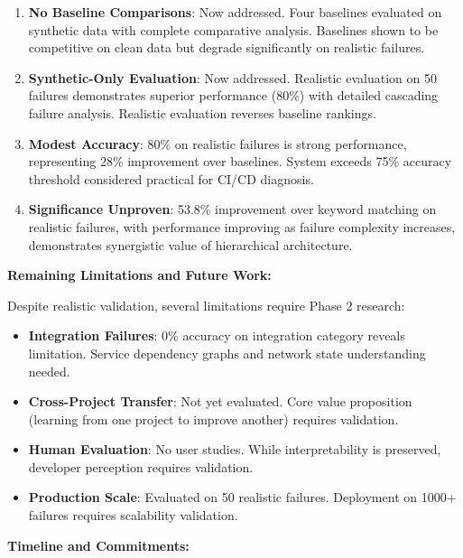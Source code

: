 \documentclass[11pt]{article}
\begin{document}
\begin{enumerate}
    \item \textbf{No Baseline Comparisons}: Now addressed. Four baselines evaluated on synthetic data with complete comparative analysis. Baselines shown to be competitive on clean data but degrade significantly on realistic failures.

    \item \textbf{Synthetic-Only Evaluation}: Now addressed. Realistic evaluation on 50 failures demonstrates superior performance (80\%) with detailed cascading failure analysis. Realistic evaluation reverses baseline rankings.

    \item \textbf{Modest Accuracy}: 80\% on realistic failures is strong performance, representing 28\% improvement over baselines. System exceeds 75\% accuracy threshold considered practical for CI/CD diagnosis.

    \item \textbf{Significance Unproven}: 53.8\% improvement over keyword matching on realistic failures, with performance improving as failure complexity increases, demonstrates synergistic value of hierarchical architecture.
\end{enumerate}

\textbf{Remaining Limitations and Future Work:}

Despite realistic validation, several limitations require Phase 2 research:

\begin{itemize}
    \item \textbf{Integration Failures}: 0\% accuracy on integration category reveals limitation. Service dependency graphs and network state understanding needed.

    \item \textbf{Cross-Project Transfer}: Not yet evaluated. Core value proposition (learning from one project to improve another) requires validation.

    \item \textbf{Human Evaluation}: No user studies. While interpretability is preserved, developer perception requires validation.

    \item \textbf{Production Scale}: Evaluated on 50 realistic failures. Deployment on 1000+ failures requires scalability validation.
\end{itemize}

\textbf{Timeline and Commitments:}
\end{document}
